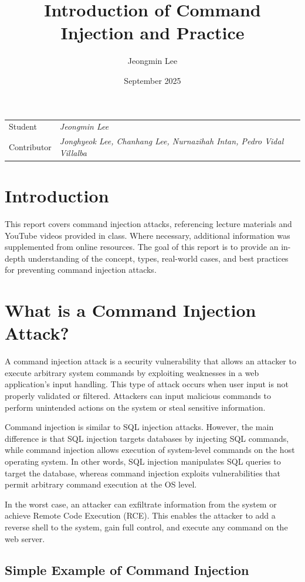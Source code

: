 \documentclass{article}
\title{Introduction of Command Injection and Practice}
\author{Jeongmin Lee}
\date{September 2025}
\begin{document}
\maketitle

\noindent\begin{tabular}{@{}ll}
  Student & \textit{Jeongmin Lee}\\
  Contributor & \textit{Jonghyeok Lee, Chanhang Lee, Nurnazihah Intan, Pedro Vidal Villalba}\\
\end{tabular}

\section*{Introduction}
This report covers command injection attacks, referencing lecture materials and YouTube videos provided in class. Where necessary, additional information was supplemented from online resources. The goal of this report is to provide an in-depth understanding of the concept, types, real-world cases, and best practices for preventing command injection attacks.

\section*{What is a Command Injection Attack?}
A command injection attack is a security vulnerability that allows an attacker to execute arbitrary system commands by exploiting weaknesses in a web application's input handling.
This type of attack occurs when user input is not properly validated or filtered.
Attackers can input malicious commands to perform unintended actions on the system or steal sensitive information.

Command injection is similar to SQL injection attacks. However, the main difference is that SQL injection targets databases by injecting SQL commands, while command injection allows execution of system-level commands on the host operating system.
In other words, SQL injection manipulates SQL queries to target the database, whereas command injection exploits vulnerabilities that permit arbitrary command execution at the OS level.

In the worst case, an attacker can exfiltrate information from the system or achieve Remote Code Execution (RCE).
This enables the attacker to add a reverse shell to the system, gain full control, and execute any command on the web server.

\subsection*{Simple Example of Command Injection}
\end{document}

